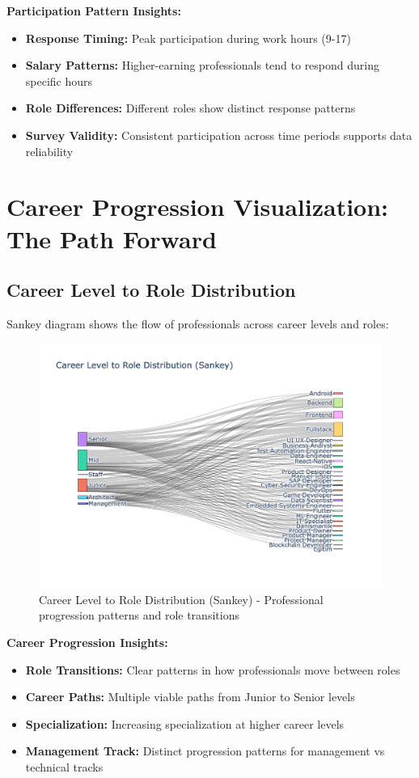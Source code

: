 \documentclass[12pt,a4paper]{article}
\begin{document}
\textbf{Participation Pattern Insights:}
\begin{itemize}
    \item \textbf{Response Timing:} Peak participation during work hours (9-17)
    \item \textbf{Salary Patterns:} Higher-earning professionals tend to respond during specific hours
    \item \textbf{Role Differences:} Different roles show distinct response patterns
    \item \textbf{Survey Validity:} Consistent participation across time periods supports data reliability
\end{itemize}

\section{Career Progression Visualization: The Path Forward}

\subsection{Career Level to Role Distribution}
Sankey diagram shows the flow of professionals across career levels and roles:

\begin{figure}[H]
    \centering
    \includegraphics[width=\textwidth]{figures/sankey_career_level_role.png}
    \caption{Career Level to Role Distribution (Sankey) - Professional progression patterns and role transitions}
\end{figure}

\textbf{Career Progression Insights:}
\begin{itemize}
    \item \textbf{Role Transitions:} Clear patterns in how professionals move between roles
    \item \textbf{Career Paths:} Multiple viable paths from Junior to Senior levels
    \item \textbf{Specialization:} Increasing specialization at higher career levels
    \item \textbf{Management Track:} Distinct progression patterns for management vs technical tracks
\end{itemize}
\end{document}
